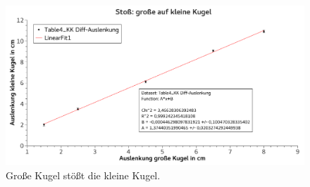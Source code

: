 \documentclass[
	a4paper,
	12pt,
	pagesize,
	ngerman
]{scrartcl}
\begin{document}
	\begin{figure}[htb]
	  \centering
	    \includegraphics[width=1.0\textwidth]{StossGKaufKK}
	  \caption{Große Kugel stößt die kleine Kugel.}
		\label{GraphGKaufKK}
	\end{figure}
\end{document}
